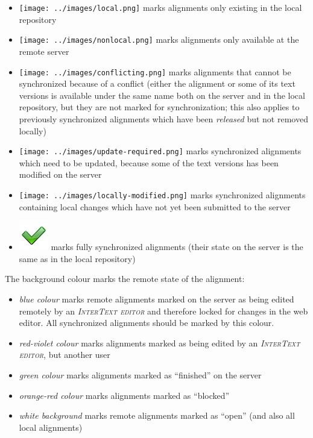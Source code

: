 \documentclass[a4paper,10pt,oneside]{book}
\newcommand{\ITeditor}{\textit{\textsc{InterText editor}}\xspace}
\begin{document}
\begin{itemize}
 \item \texttt{[image: ../images/local.png]} marks alignments only existing in the local repository
 \item \texttt{[image: ../images/nonlocal.png]} marks alignments only available at the remote server
 \item \texttt{[image: ../images/conflicting.png]} marks alignments that cannot be synchronized because of a conflict (either the alignment or some of its text versions is available under the same name both on the server and in the local repository, but they are not marked for synchronization; this also applies to previously synchronized alignments which have been \emph{released} but not removed locally)
 \item \texttt{[image: ../images/update-required.png]} marks synchronized alignments which need to be updated, because some of the text versions has been modified on the server
 \item \texttt{[image: ../images/locally-modified.png]} marks synchronized alignments containing local changes which have not yet been submitted to the server
 \item \includegraphics[height=1.5ex]{../images/48/confirmed.png} marks fully synchronized alignments (their state on the server is the same as in the local repository)
\end{itemize}

The background colour marks the remote state of the alignment:

\begin{itemize}
 \item \emph{blue colour} marks remote alignments marked on the server as being edited remotely by an \ITeditor and therefore locked for changes in the web editor. All synchronized alignments should be marked by this colour.
 \item \emph{red-violet colour} marks alignments marked as being edited by an \ITeditor, but another user
 \item \emph{green colour} marks alignments marked as ``finished'' on the server
 \item \emph{orange-red colour} marks alignments marked as ``blocked''
 \item \emph{white background} marks remote alignments marked as ``open'' (and also all local alignments)
\end{itemize}
\end{document}
